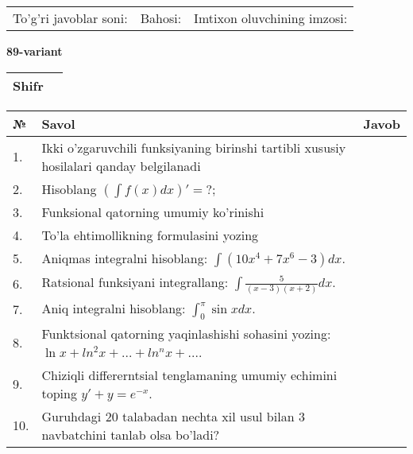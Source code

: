 \documentclass{article}
\begin{document}
  \vspace{1cm}
  
  \begin{tabular}{lll}
  To'g'ri javoblar soni: \underline{\hspace{1.5cm}} & 
  Bahosi: \underline{\hspace{1.5cm}} & 
  Imtixon oluvchining imzosi: \underline{\hspace{2cm}} \\
  \end{tabular}
  
  \egroup
  
  \newpage
  
  
  \textbf{89-variant}\\
  
  \bgroup
  \def\arraystretch{1.6} %
  
  \begin{tabular}{|m{5.7cm}|m{9.5cm}|}
  \hline
  Shifr & \\
  \hline
  \end{tabular}
  
  \vspace{1cm}
  
  \begin{tabular}{|m{0.7cm}|m{10cm}|m{4cm}|}
  \hline
  № & Savol & Javob \\
  \hline
  1. & Ikki o'zgaruvchili funksiyaning birinshi tartibli xususiy hosilalari qanday belgilanadi &  \\
  \hline
  2. & Hisoblang \(\left( \int {f(x)dx} \right)' = ?\); &  \\
  \hline
  3. & Funksional qatorning umumiy ko'rinishi &  \\
  \hline
  4. & To'la ehtimollikning formulasini yozing &  \\
  \hline
  5. & Aniqmas integralni hisoblang: \(\int {\left( 10x^{4} + 7x^{6} - 3 \right)dx}\). &  \\
  \hline
  6. & Ratsional funksiyani integrallang: \(\int {\frac{5}{(x - 3)(x + 2)}dx}\). &  \\
  \hline
  7. & Aniq integralni hisoblang: \(\int_{0}^{\pi}{\sin xdx}\). &  \\
  \hline
  8. & Funktsional qatorning yaqinlashishi sohasini yozing: \(\ln x + ln^{2}x + ... + ln^{n}x + ...\). &  \\
  \hline
  9. & Chiziqli differerntsial tenglamaning umumiy echimini toping \(y' + y = e^{- x}\). &  \\
  \hline
  10. & Guruhdagi 20 talabadan nechta xil usul bilan 3 navbatchini tanlab olsa bo'ladi? &  \\
  \hline
  \end{tabular}
  
\end{document}
